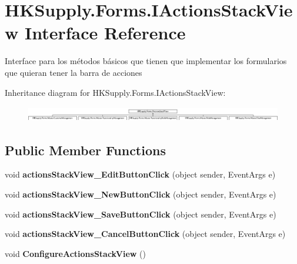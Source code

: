 \hypertarget{interface_h_k_supply_1_1_forms_1_1_i_actions_stack_view}{}\section{H\+K\+Supply.\+Forms.\+I\+Actions\+Stack\+View Interface Reference}
\label{interface_h_k_supply_1_1_forms_1_1_i_actions_stack_view}


Interface para los métodos básicos que tienen que implementar los formularios que quieran tener la barra de acciones  


Inheritance diagram for H\+K\+Supply.\+Forms.\+I\+Actions\+Stack\+View\+:\begin{figure}[H]
\begin{center}
\leavevmode
\includegraphics[height=0.676737cm]{interface_h_k_supply_1_1_forms_1_1_i_actions_stack_view}
\end{center}
\end{figure}
\subsection*{Public Member Functions}
\begin{DoxyCompactItemize}
\item 
\mbox{\label{interface_h_k_supply_1_1_forms_1_1_i_actions_stack_view_ae8deb0cdeaa1b41f48e9a497acce9334}} 
void {\bfseries actions\+Stack\+View\+\_\+\+Edit\+Button\+Click} (object sender, Event\+Args e)
\item 
\mbox{\label{interface_h_k_supply_1_1_forms_1_1_i_actions_stack_view_a9a3873c8695cb595fe413b51be87210d}} 
void {\bfseries actions\+Stack\+View\+\_\+\+New\+Button\+Click} (object sender, Event\+Args e)
\item 
\mbox{\label{interface_h_k_supply_1_1_forms_1_1_i_actions_stack_view_a31fb0c34c49bb46661a612f1916f7c2e}} 
void {\bfseries actions\+Stack\+View\+\_\+\+Save\+Button\+Click} (object sender, Event\+Args e)
\item 
\mbox{\label{interface_h_k_supply_1_1_forms_1_1_i_actions_stack_view_aa9fb7f15cdbc1fb6fdc19b522327a34a}} 
void {\bfseries actions\+Stack\+View\+\_\+\+Cancel\+Button\+Click} (object sender, Event\+Args e)
\item 
\mbox{\label{interface_h_k_supply_1_1_forms_1_1_i_actions_stack_view_a1a01439762b8cc84888acc2c7b7230d2}} 
void {\bfseries Configure\+Actions\+Stack\+View} ()
\end{DoxyCompactItemize}


